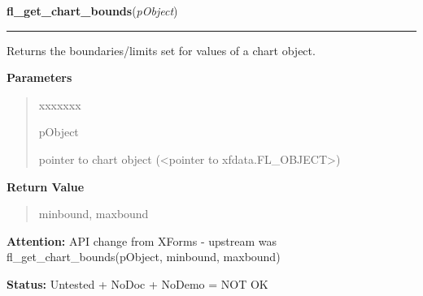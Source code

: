 \hspace{.8\funcindent}\begin{boxedminipage}{\funcwidth}

    \raggedright \textbf{fl\_get\_chart\_bounds}(\textit{pObject})

    \vspace{-1.5ex}

    \rule{\textwidth}{0.5\fboxrule}
\setlength{\parskip}{2ex}
    Returns the boundaries/limits set for values of a chart object.

\setlength{\parskip}{1ex}
      \textbf{Parameters}
      \vspace{-1ex}

      \begin{quote}
        \begin{Ventry}{xxxxxxx}

          \item[pObject]

          pointer to chart object ({\textless}pointer to 
          xfdata.FL\_OBJECT{\textgreater})

        \end{Ventry}

      \end{quote}

      \textbf{Return Value}
    \vspace{-1ex}

      \begin{quote}
      minbound, maxbound

      \end{quote}

\textbf{Attention:} API change from XForms - upstream was fl\_get\_chart\_bounds(pObject, 
minbound, maxbound)



\textbf{Status:} Untested + NoDoc + NoDemo = NOT OK



    \end{boxedminipage}

    \label{xformslib:library:fl_set_chart_maxnumb}

    \vspace{0.5ex}

